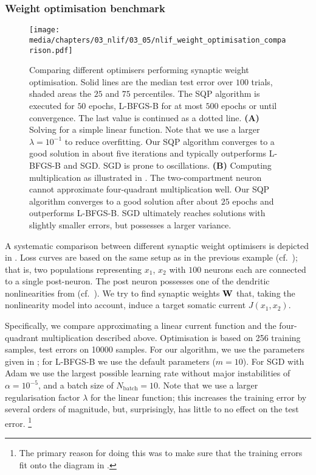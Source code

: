 \pagebreak

\subsubsection{Weight optimisation benchmark}

\begin{figure}
	\centering
	\texttt{[image: media/chapters/03\_nlif/03\_05/nlif\_weight\_optimisation\_comparison.pdf]}%
	{\label{fig:nlif_weight_optimisation_comparison_a}}%
	{\label{fig:nlif_weight_optimisation_comparison_b}}%
	\caption[Comparing different optimisers performing synaptic weight optimisation]{Comparing different optimisers performing synaptic weight optimisation.
	Solid lines are the median test error over $100$ trials, shaded areas the $25$ and $75$ percentiles.
	The SQP algorithm is executed for $50$ epochs, L-BFGS-B for at most $500$ epochs or until convergence.
	The last value is continued as a dotted line.
	\textbf{(A)} Solving for a simple linear function. Note that we use a larger $\lambda = 10^{-1}$ to reduce overfitting. Our SQP algorithm converges to a good solution in about five iterations and typically outperforms L-BFGS-B and SGD. SGD is prone to oscillations.
	\textbf{(B)} Computing multiplication as illustrated in .
	The two-compartment neuron cannot approximate four-quadrant multiplication well.
	Our SQP algorithm converges to a good solution after about $25$ epochs and outperforms L-BFGS-B.
	SGD ultimately reaches solutions with slightly smaller errors, but possesses a larger variance.
	}
	\label{fig:nlif_weight_optimisation_comparison}
\end{figure}

A systematic comparison between different synaptic weight optimisers is depicted in .
Loss curves are based on the same setup as in the previous example (cf.~); that is, two populations representing $x_1$, $x_2$ with $100$ neurons each are connected to a single post-neuron.
The post neuron possesses one of the dendritic nonlinearities from  (cf.~).
We try to find synaptic weights $\mathbf{W}$ that, taking the nonlinearity model into account, induce a target somatic current $J(x_1, x_2)$.

Specifically, we compare approximating a linear current function and the four-quadrant multiplication described above.
Optimisation is based on \num{256} training samples, test errors on \num{10000} samples.
For our algorithm, we use the parameters given in ; for L-BFGS-B we use the default parameters ($m = 10$).
For SGD with Adam we use the largest possible learning rate without major instabilities of $\alpha = 10^{-5}$, and a batch size of $N_\mathrm{batch} = 10$.
Note that we use a larger regularisation factor $\lambda$ for the linear function; this increases the training error by several orders of magnitude, but, surprisingly, has little to no effect on the test error.%
\footnote{The primary reason for doing this was to make sure that the training errors fit onto the diagram in .}

